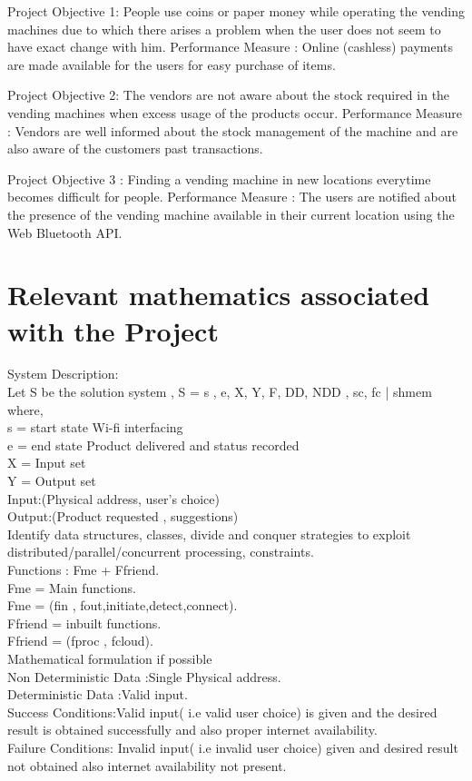 \documentclass[oneside,a4paper,12pt]{report}
\begin{document}
Project Objective 1:
People use coins or paper money while operating the vending machines due to which there arises a problem when the user does not seem to have exact change with him.
Performance Measure :
Online (cashless) payments are made available for the users for easy purchase of items.

Project Objective 2:
The vendors are not aware about the stock required in the vending machines when excess usage of the products occur.
Performance Measure :
Vendors are well informed about the stock management of the machine and are also aware of the customers past transactions.

Project Objective 3 :
Finding a vending machine in new locations everytime becomes difficult for people.
Performance Measure :
The users are notified about the presence of the vending machine available in their current location using the Web Bluetooth API.
	
\section{Relevant mathematics associated with the Project}
\label{sec:math}
System Description:\\
 Let S be the solution system ,
	  S = {s , e, X, Y, F, DD, NDD , sc, fc | shmem}\\
            where,    \\   
s = start state {Wi-fi interfacing}\\
e = end state { Product delivered and status recorded}\\
X = Input set\\
Y = Output set\\
Input:(Physical address, user’s choice)	\\ 
Output:(Product requested , suggestions)\\ 
Identify data structures, classes, divide and conquer strategies to exploit distributed/parallel/concurrent processing, constraints. \\
Functions : Fme + Ffriend.\\
Fme = Main functions.\\
Fme = (fin , fout,initiate,detect,connect).\\
Ffriend = inbuilt functions.\\
Ffriend = (fproc , fcloud).\\
Mathematical formulation if possible\\
Non Deterministic Data :Single Physical address.\\
Deterministic Data :Valid input.\\
Success Conditions:Valid input( i.e valid user choice) is given and the desired result is obtained successfully and also proper internet availability.\\
Failure Conditions: Invalid input( i.e invalid user choice)  given and desired result not obtained also internet availability not present.\\
\end{document}
